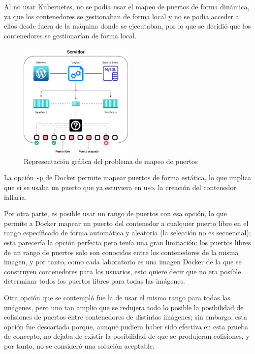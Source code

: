 \begin{appendices}
            Al no usar Kubernetes, no se podía usar el mapeo de puertos de forma dinámica, ya que los contenedores se gestionaban de forma local y no se podía acceder a ellos desde fuera de la máquina donde se ejecutaban, por lo que se decidió que los contenedores se gestionarían de forma local.

            \begin{figure}[htbp]
                \centering

                \includegraphics[width=0.5\textwidth]{images/Diagramas/puertos.png}
                \caption{Representación gráfica del problema de mapeo de puertos}
                \label{fig:mapeo-puertos}
            \end{figure}

            La opción \texttt{-p} de Docker permite mapear puertos de forma estática, lo que implica que si se usaba un puerto que ya estuviera en uso, la creación del contenedor fallaría.
            
            Por otra parte, es posible usar un rango de puertos con esa opción, lo que permite a Docker mapear un puerto del contenedor a cualquier puerto libre en el rango específicado de forma automática y aleatoria (la selección no es secuencial); esta parecería la opción perfecta pero tenía una gran limitación: los puertos libres de un rango de puertos solo son conocidos entre los contenedores de la misma imagen, y por tanto, como cada laboratorio es una imagen Docker de la que se construyen contenedores para los usuarios, esto quiere decir que no era posible determinar todos los puertos libres para todas las imágenes.
            
            Otra opción que se contempló fue la de usar el mismo rango para todas las imágenes, pero uno tan amplio que se redujera todo lo posible la posibilidad de colisiones de puertos entre contenedores de distintas imágenes; sin embargo, esta opción fue descartada porque, aunque pudiera haber sido efectiva en esta prueba de concepto, no dejaba de existir la posibilidad de que se produjeran colisiones, y por tanto, no se consideró una solución aceptable.


\end{appendices}
